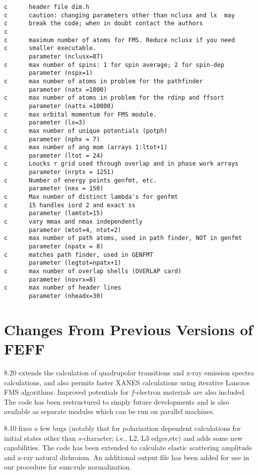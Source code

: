 \documentclass[11pt,oneside]{report} %
\begin{document}
{\begin{verbatim}
c      header file dim.h
c      caution: changing parameters other than nclusx and lx  may
c      break the code; when in doubt contact the authors
c
c      maximum number of atoms for FMS. Reduce nclusx if you need
c      smaller executable.
       parameter (nclusx=87)
c      max number of spins: 1 for spin average; 2 for spin-dep
       parameter (nspx=1)
c      max number of atoms in problem for the pathfinder
       parameter (natx =1000)
c      max number of atoms in problem for the rdinp and ffsort
       parameter (nattx =10000)
c      max orbital momentum for FMS module.
       parameter (lx=3)
c      max number of unique potentials (potph)
       parameter (nphx = 7)
c      max number of ang mom (arrays 1:ltot+1)
       parameter (ltot = 24)
c      Loucks r grid used through overlap and in phase work arrays
       parameter (nrptx = 1251)
c      Number of energy points genfmt, etc.
       parameter (nex = 150)
c      Max number of distinct lambda's for genfmt
c      15 handles iord 2 and exact ss
       parameter (lamtot=15)
c      vary mmax and nmax independently
       parameter (mtot=4, ntot=2)
c      max number of path atoms, used in path finder, NOT in genfmt
       parameter (npatx = 8)
c      matches path finder, used in GENFMT
       parameter (legtot=npatx+1)
c      max number of overlap shells (OVERLAP card)
       parameter (novrx=8)
c      max number of header lines
       parameter (nheadx=30)

\end{verbatim}

\chapter{Changes From Previous Versions of FEFF}
\label{sec:Appendix-E.-Changes}


{\feff}8.20  extends the calculation of quadrupolar transitions
and x-ray emission spectra calculations, and also permits
faster XANES calculations using iterative Lanczos FMS algorithms.
Improved potentials for $f$-electron materials are also included.
The code has been restructured to simply future developments and 
is also available as separate modules which can be
run on parallel machines.

{\feff}8.10 fixes a few bugs
(notably that for polarization dependent
calculations for initial states other than $s$-character; i.e.,
L2, L3 edges,etc) and adds some new capabilities. The code 
has been extended to calculate elastic scattering
amplitude and x-ray natural dichroism. An additional output file has been
added  for use in our procedure for sum-rule
normalization.

}
\end{document}
